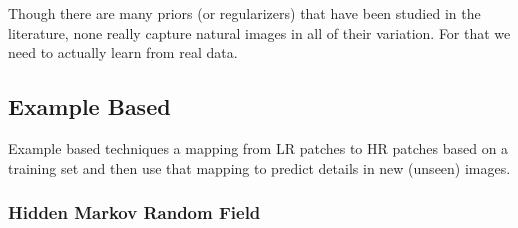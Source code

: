Though there are many priors (or regularizers) that have been studied in the literature, none really capture natural images in all of their variation.
%
For that we need to actually learn from real data.

\subsection{Example Based}\label{subsec:example-based}

Example based techniques  a mapping from
LR patches to HR patches based on a training set and then use that mapping to predict details in new (unseen) images. 

\subsubsection{Hidden Markov Random Field}

